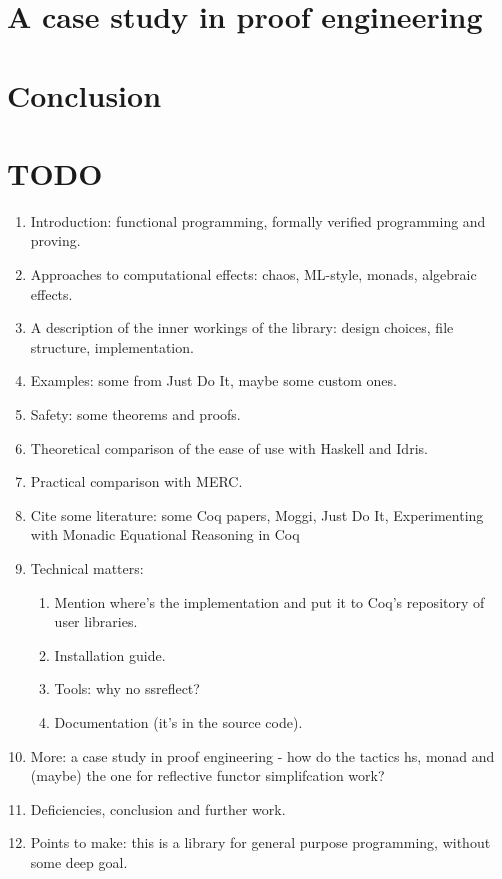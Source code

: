 \documentclass[declaration,inz,english,shortabstract]{iithesis}
\begin{document}
\chapter{A case study in proof engineering}

\chapter{Conclusion}

\chapter{TODO}

\begin{enumerate}
    \item Introduction: functional programming, formally verified programming and proving.
    \item Approaches to computational effects: chaos, ML-style, monads, algebraic effects.
    \item A description of the inner workings of the library: design choices, file structure, implementation.
    \item Examples: some from Just Do It, maybe some custom ones.
    \item Safety: some theorems and proofs.
    \item Theoretical comparison of the ease of use with Haskell and Idris.
    \item Practical comparison with MERC.
    \item Cite some literature: some Coq papers, Moggi, Just Do It, Experimenting with Monadic Equational Reasoning in Coq
    \item Technical matters:
    \begin{enumerate}
        \item Mention where's the implementation and put it to Coq's repository of user libraries.
        \item Installation guide.
        \item Tools: why no ssreflect?
        \item Documentation (it's in the source code).
    \end{enumerate}
    \item More: a case study in proof engineering - how do the tactics hs, monad and (maybe) the one for reflective functor simplifcation work?
    \item Deficiencies, conclusion and further work.
    \item Points to make: this is a library for general purpose programming, without some deep goal.
\end{enumerate}
\end{document}
